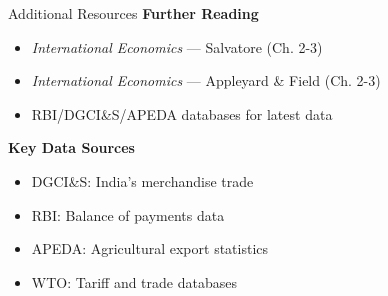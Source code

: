 \documentclass[
  ignorenonframetext,
  aspectratio=169,
]{beamer}
\makeatletter
\providecommand{\tightlist}{%
  \setlength{\itemsep}{0pt}\setlength{\parskip}{0pt}}
\let\quarto@originallabel\label
\DeclareRobustCommand*{\label}[1]{\quarto@originallabel{#1}}
\makeatother
\begin{document}
\begin{frame}{Additional Resources}
\label{additional-resources}
\textbf{Further Reading}

\begin{itemize}
\tightlist
\item
  \emph{International Economics} --- Salvatore (Ch. 2-3)
\item
  \emph{International Economics} --- Appleyard \& Field (Ch. 2-3)
\item
  RBI/DGCI\&S/APEDA databases for latest data
\end{itemize}

\textbf{Key Data Sources}

\begin{itemize}
\tightlist
\item
  DGCI\&S: India's merchandise trade
\item
  RBI: Balance of payments data\\
\item
  APEDA: Agricultural export statistics
\item
  WTO: Tariff and trade databases
\end{itemize}
\end{frame}
\end{document}
